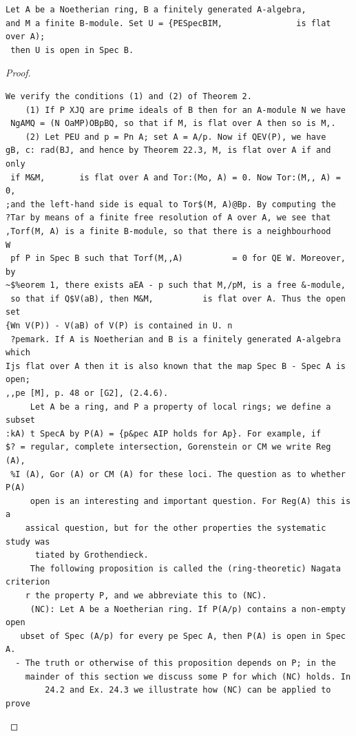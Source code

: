 \begin{theorem}\label{mcrt-auto-theorem-24-3}\uses{}
\begin{verbatim}
Let A be a Noetherian ring, B a finitely generated A-algebra,
and M a finite B-module. Set U = {PESpecBIM,               is flat over A);
 then U is open in Spec B.
\end{verbatim}
\end{theorem}
\begin{proof}
\begin{verbatim}
We verify the conditions (1) and (2) of Theorem 2.
    (1) If P XJQ are prime ideals of B then for an A-module N we have
 NgAMQ = (N OaMP)OBpBQ, so that if M, is flat over A then so is M,.
    (2) Let PEU and p = Pn A; set A = A/p. Now if QEV(P), we have
gB, c: rad(BJ, and hence by Theorem 22.3, M, is flat over A if and only
 if M&M,       is flat over A and Tor:(Mo, A) = 0. Now Tor:(M,, A) = 0,
;and the left-hand side is equal to Tor$(M, A)@Bp. By computing the
?Tar by means of a finite free resolution of A over A, we see that
,Torf(M, A) is a finite B-module, so that there is a neighbourhood         W
 pf P in Spec B such that Torf(M,,A)          = 0 for QE W. Moreover, by
~$%eorem 1, there exists aEA - p such that M,/pM, is a free &-module,
 so that if Q$V(aB), then M&M,          is flat over A. Thus the open set
{Wn V(P)) - V(aB) of V(P) is contained in U. n
 ?pemark. If A is Noetherian and B is a finitely generated A-algebra which
Ijs flat over A then it is also known that the map Spec B - Spec A is open;
,,pe [M], p. 48 or [G2], (2.4.6).
     Let A be a ring, and P a property of local rings; we define a subset
:kA) t SpecA by P(A) = {p&pec AIP holds for Ap}. For example, if
$? = regular, complete intersection, Gorenstein or CM we write Reg (A),
 %I (A), Gor (A) or CM (A) for these loci. The question as to whether P(A)
     open is an interesting and important question. For Reg(A) this is a
    assical question, but for the other properties the systematic study was
      tiated by Grothendieck.
     The following proposition is called the (ring-theoretic) Nagata criterion
    r the property P, and we abbreviate this to (NC).
     (NC): Let A be a Noetherian ring. If P(A/p) contains a non-empty open
   ubset of Spec (A/p) for every pe Spec A, then P(A) is open in Spec A.
  - The truth or otherwise of this proposition depends on P; in the
    mainder of this section we discuss some P for which (NC) holds. In
        24.2 and Ex. 24.3 we illustrate how (NC) can be applied to prove

\end{verbatim}
\end{proof}
